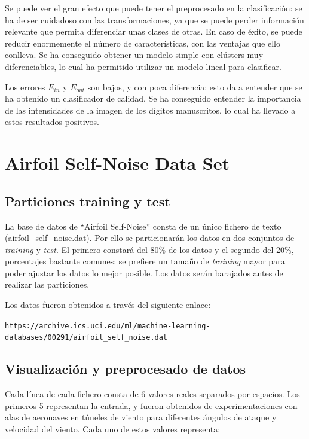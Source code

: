 \documentclass[12pt,spanish]{article} %
\begin{document}
Se puede ver el gran efecto que puede tener el preprocesado en la clasificación: se ha de ser cuidadoso con las transformaciones, ya que se puede perder información relevante que permita diferenciar unas clases de otras. En caso de éxito, se puede reducir enormemente el número de características, con las ventajas que ello conlleva. Se ha conseguido obtener un modelo simple con clústers muy diferenciables, lo cual ha permitido utilizar un modelo lineal para clasificar.

Los errores $E_{in}$ y $E_{out}$ son bajos, y con poca diferencia: esto da a entender que se ha obtenido un clasificador de calidad. Se ha conseguido entender la importancia de las intensidades de la imagen de los dígitos manuscritos, lo cual ha llevado a estos resultados positivos.


\section{Airfoil Self-Noise Data Set}

\subsection{Particiones training y test}

La base de datos de ``Airfoil Self-Noise'' consta de un único fichero de texto (airfoil\_self\_noise.dat). Por ello se particionarán los datos en dos conjuntos de \textit{training} y \textit{test}. El primero constará del 80\% de los datos y el segundo del 20\%, porcentajes bastante comunes; se prefiere un tamaño de \textit{training} mayor para poder ajustar los datos lo mejor posible. Los datos serán barajados antes de realizar las particiones.

Los datos fueron obtenidos a través del siguiente enlace:

\noindent
{\small \texttt{https://archive.ics.uci.edu/ml/machine-learning-databases/00291/airfoil\_self\_noise.dat}}

\subsection{Visualización y preprocesado de datos}

Cada línea de cada fichero consta de 6 valores reales separados por espacios. Los primeros 5 representan la entrada, y fueron obtenidos de experimentaciones con alas de aeronaves en túneles de viento para diferentes ángulos de ataque y velocidad del viento. Cada uno de estos valores representa:
\end{document}
